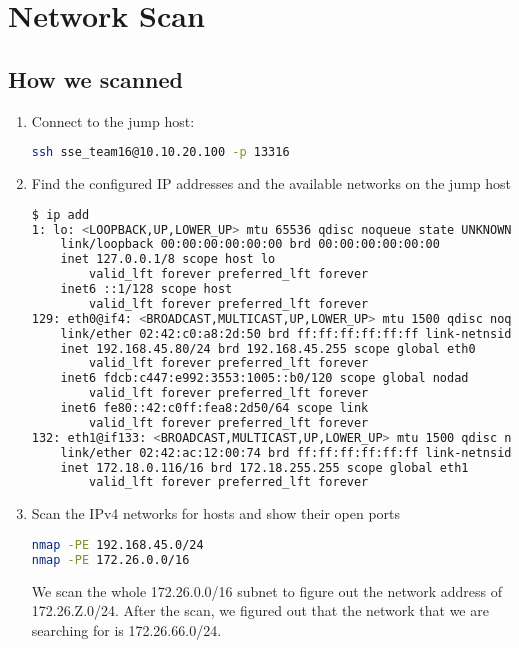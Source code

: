 \section{Network Scan}

\subsection{How we scanned}
\begin{enumerate}
    \item Connect to the jump host:
    \begin{lstlisting}[language=bash,numbers=none]
ssh sse_team16@10.10.20.100 -p 13316
    \end{lstlisting}

    \item Find the configured IP addresses and the available networks on the jump host
    \begin{lstlisting}[language=bash,numbers=none]
$ ip add
1: lo: <LOOPBACK,UP,LOWER_UP> mtu 65536 qdisc noqueue state UNKNOWN group default qlen 1000
    link/loopback 00:00:00:00:00:00 brd 00:00:00:00:00:00
    inet 127.0.0.1/8 scope host lo
        valid_lft forever preferred_lft forever
    inet6 ::1/128 scope host
        valid_lft forever preferred_lft forever
129: eth0@if4: <BROADCAST,MULTICAST,UP,LOWER_UP> mtu 1500 qdisc noqueue state UP group default
    link/ether 02:42:c0:a8:2d:50 brd ff:ff:ff:ff:ff:ff link-netnsid 0
    inet 192.168.45.80/24 brd 192.168.45.255 scope global eth0
        valid_lft forever preferred_lft forever
    inet6 fdcb:c447:e992:3553:1005::b0/120 scope global nodad
        valid_lft forever preferred_lft forever
    inet6 fe80::42:c0ff:fea8:2d50/64 scope link
        valid_lft forever preferred_lft forever
132: eth1@if133: <BROADCAST,MULTICAST,UP,LOWER_UP> mtu 1500 qdisc noqueue state UP group default
    link/ether 02:42:ac:12:00:74 brd ff:ff:ff:ff:ff:ff link-netnsid 0
    inet 172.18.0.116/16 brd 172.18.255.255 scope global eth1
        valid_lft forever preferred_lft forever
    \end{lstlisting}

    \item Scan the IPv4 networks for hosts and show their open ports
    \begin{lstlisting}[language=bash,numbers=none]
nmap -PE 192.168.45.0/24
nmap -PE 172.26.0.0/16
    \end{lstlisting}
    We scan the whole 172.26.0.0/16 subnet to figure out the network address of 172.26.Z.0/24.
    After the scan, we figured out that the network that we are searching for is 172.26.66.0/24.


\end{enumerate}
